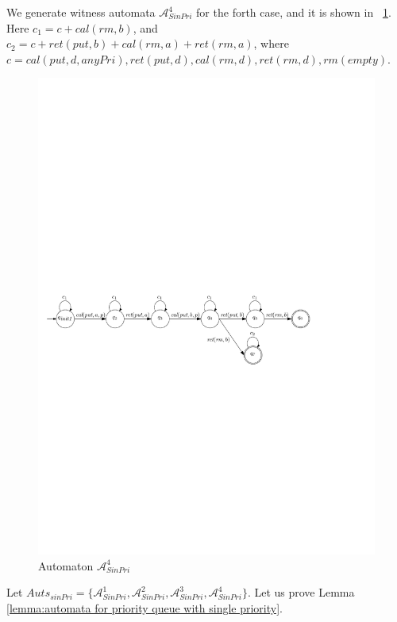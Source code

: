 We generate witness automata $\mathcal{A}_{\textit{SinPri}}^4$ for the forth case, and it is shown in \figurename~\ref{fig:automata for FIFO-4}. Here $c_1 = c + \textit{cal}(\textit{rm},b)$, and $c_2 = c + \textit{ret}(\textit{put},b) + \textit{cal}(\textit{rm},a) + \textit{ret}(\textit{rm},a)$, where $c = \textit{cal}(\textit{put},d,\textit{anyPri}),\textit{ret}(\textit{put},d), \textit{cal}(\textit{rm},d),\textit{ret}(\textit{rm},d),\textit{rm}(\textit{empty})$.

\begin{figure}[htbp]
  \centering
  \includegraphics[width=0.9 \textwidth]{figures/PIC_AUTO_FIFO_4.pdf}
  \caption{Automaton $\mathcal{A}_{\textit{SinPri}}^4$}
  \label{fig:automata for FIFO-4}
\end{figure}

Let $\textit{Auts}_{\textit{sinPri}} = \{ \mathcal{A}_{\textit{SinPri}}^1, \mathcal{A}_{\textit{SinPri}}^2, \mathcal{A}_{\textit{SinPri}}^3, \mathcal{A}_{\textit{SinPri}}^4 \}$. Let us prove Lemma \ref{lemma:automata for priority queue with single priority}.


